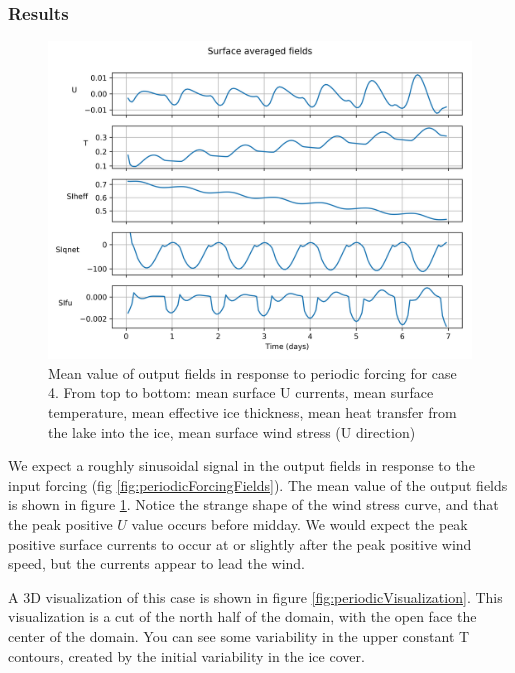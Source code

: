 \documentclass[11pt]{article}
\begin{document}
\subsubsection{Results}
\begin{figure}[h!]
\includegraphics[width=\linewidth]{periodicForcing/response-fields}
\caption{Mean value of output fields in response to periodic forcing for case 4. From top to bottom: mean surface U currents, mean surface temperature, mean effective ice thickness, mean heat transfer from the lake into the ice, mean surface wind stress (U direction)}
\label{fig:periodicForcingResponse}
\end{figure}

We expect a roughly sinusoidal signal in the output fields in response to the input forcing (fig \ref{fig:periodicForcingFields}). The mean value of the output fields is shown in figure \ref{fig:periodicForcingResponse}. Notice the strange shape of the wind stress curve, and that the peak positive $U$ value occurs before midday. We would expect the peak positive surface currents to occur at or slightly after the peak positive wind speed, but the currents appear to lead the wind.

A 3D visualization of this case is shown in figure \ref{fig:periodicVisualization}. This visualization is a cut of the north half of the domain, with the open face the center of the domain. You can see some variability in the upper constant T contours, created by the initial variability in the ice cover.
\end{document}
